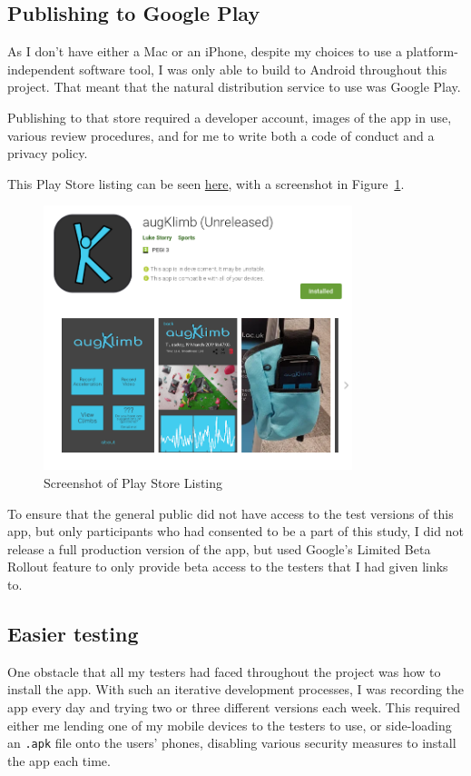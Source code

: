 \subsection{Publishing to Google Play}
As I don't have either a Mac or an iPhone, despite my choices to use a platform-independent software tool, I was only able to build to Android throughout this project.
That meant that the natural distribution service to use was Google Play.

Publishing to that store required a developer account, images of the app in use, various review procedures, and for me to write both a code of conduct and a privacy policy.

This Play Store listing can be seen \href{https://play.google.com/store/apps/details?id=com.lukestorry.augKlimb}{here}, with a screenshot in Figure~\ref{fig:playstore}.


\begin{figure}[h]
\centering
\includegraphics[width=9cm]{imgs/playstorescreenshot}
\caption{Screenshot of Play Store Listing}
\label{fig:playstore}
\end{figure}

To ensure that the general public did not have access to the test versions of this app, but only participants who had consented to be a part of this study, I did not release a full production version of the app, but used Google's Limited Beta Rollout feature to only provide beta access to the testers that I had given links to.


\subsection{Easier testing}
One obstacle that all my testers had faced throughout the project was how to install the app.
With such an iterative development processes, I was recording the app every day and trying two or three different versions each week.
This required either me lending one of my mobile devices to the testers to use, or side-loading an \verb|.apk| file onto the users' phones, disabling various security measures to install the app each time.

